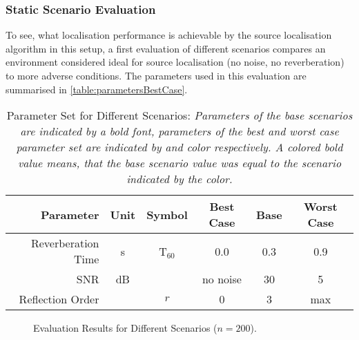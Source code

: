 \subsubsection{Static Scenario Evaluation}
\label{sec:ScenarioEvalStatic}

To see, what localisation performance is achievable by the source localisation algorithm in this setup, a first evaluation of different scenarios compares an environment considered ideal for source localisation (no noise, no reverberation) to more adverse conditions. The parameters used in this evaluation are summarised in \autoref{table:parametersBestCase}.

\begin{table}[!hbt]
	\begin{tabular}{rccccc}
		\toprule
		Parameter          & Unit & Symbol   & Best Case & Base     & Worst Case \\
		\midrule
		Reverberation Time & s    & T$_{60}$ & 0.0       & 0.3      & 0.9        \\
		SNR                & dB   &          & no noise  & 30       & 5          \\
		Reflection Order   &      & $r$      & 0         & 3        & max        \\
		\bottomrule
	\end{tabular}
	\caption[Parameter Set for Different Scenarios]{Parameter Set for Different Scenarios: \itshape Parameters of the base scenarios are indicated by a bold font, parameters of the best and worst case parameter set are indicated by  and  color respectively. A colored bold value means, that the base scenario value was equal to the scenario indicated by the color.}
	\label{table:parametersBestCase}
\end{table}

\begin{figure}[H]
	\iftoggle{quick}{%
		\texttt{[image: plots/boxplots/boxplot-joined-best-case]}
	}{%
		
	}
	\caption[Evaluation Results for Different Scenarios]{Evaluation Results for Different Scenarios ($n=200$).}
	\label{fig:trialCases}
\end{figure}

